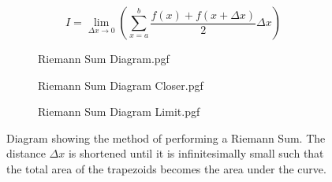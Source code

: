 \documentclass[main.tex]{subfiles}
\begin{document}
            \begin{equation}
                I = \lim_{\Delta x \to 0}\left(\sum_{x=a}^b \frac{f(x) + f(x + \Delta x)}{2}\Delta x\right)
                \label{eq: Reimann Sum}
            \end{equation}

            \vfill

            \begin{figure}[!h]
                \centering
                \hspace{-5mm}
                \begin{subfigure}[h]{0.45\textwidth}
                    \centering
                    \scalebox{0.65}
                    {
                        \begin{adjustbox}{clip,trim=20mm 10mm 10mm 10mm}
                            {{Riemann Sum Diagram.pgf}}
                        \end{adjustbox}
                    }
                \end{subfigure}
                \hfill
                \begin{subfigure}[h]{0.45\textwidth}
                    \centering
                    \scalebox{0.65}
                    {
                        \begin{adjustbox}{clip,trim=20mm 10mm 10mm 10mm}
                            {{Riemann Sum Diagram Closer.pgf}}
                        \end{adjustbox}
                    }
                \end{subfigure}
                
                \vspace{1em}

                \begin{subfigure}[h]{0.45\textwidth}
                    \centering
                    \scalebox{0.65}
                    {
                        \begin{adjustbox}{clip,trim=20mm 10mm 10mm 10mm}
                            {{Riemann Sum Diagram Limit.pgf}}
                        \end{adjustbox}
                    }
                \end{subfigure}
                \caption{Diagram showing the method of performing a Riemann Sum. The distance $\Delta x$ is shortened until it is infinitesimally small such that the total area of the trapezoids becomes the area under the curve.}
                \label{fig: Riemann Sum Diagram}
            \end{figure}
            \FloatBarrier
\end{document}
